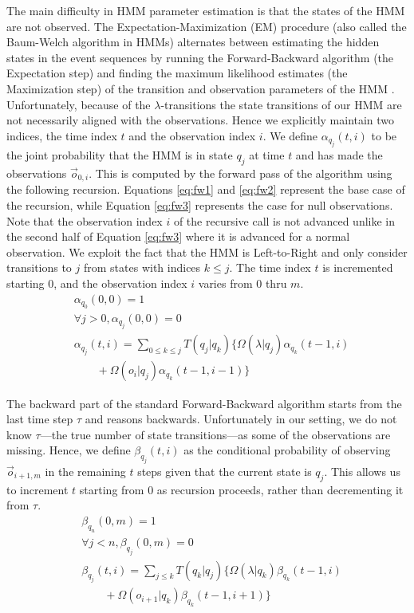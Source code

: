 \documentclass[letterpaper]{article}
\begin{document}
The main difficulty in HMM parameter estimation is that the
states of the HMM are not observed. The Expectation-Maximization  (EM)
procedure (also called the Baum-Welch algorithm in HMMs) alternates between estimating the hidden states in the event sequences by running the Forward-Backward algorithm (the Expectation step) and finding the maximum likelihood estimates (the Maximization step) of the transition and observation parameters of the HMM \cite{baum1970maximization}. %
Unfortunately, because of the $\lambda$-transitions the state transitions of our HMM are not necessarily aligned with the observations. Hence we
explicitly maintain two indices, the time index $t$ and the observation index $i$.  We define $\alpha_{q_j}(t,i)$ to be the joint probability that the HMM is in state $q_j$ at time $t$ and has made the observations $\vec{o}_{0,i}$. This is computed by the forward pass of the algorithm using the following recursion. Equations \ref{eq:fw1} and \ref{eq:fw2} represent the base case of the recursion, while Equation \ref{eq:fw3} represents the case for null observations. Note that the observation index $i$ of the recursive call is not advanced unlike in the second half of Equation \ref{eq:fw3} where it is advanced for a normal observation.  We exploit the fact that the HMM is Left-to-Right and only consider transitions to $j$ from states with indices $k \leq j$. The time index $t$ is incremented starting $0$, and the observation index $i$ varies from $0$ thru $m$. %
{\footnotesize
\begin{align}
&\alpha_{q_0}(0,0) = 1 \label{eq:fw1}\\
&\forall j > 0, \alpha_{q_j}(0,0) = 0 \label{eq:fw2}\\
&\alpha_{q_j}(t,i) = \sum_{0 \leq k \leq j} T(q_j|q_k) \{\Omega(\lambda|q_j) \alpha_{q_k}(t-1,i) \label{eq:fw3}\\
&\qquad + \Omega(o_{i}|q_j) \alpha_{q_k}(t-1,i-1) \} \nonumber
\end{align}
}%

The backward part of the standard Forward-Backward algorithm starts from the last time step $\tau$ and reasons backwards. Unfortunately in our setting, we do not know $\tau$---the true number of state transitions---as some of the observations are missing.  Hence, we define $\beta_{q_j}(t,i)$ as the conditional probability of observing $\vec{o}_{i+1,m}$ in the remaining $t$ steps given that the current state is $q_j$.  This allows us to increment $t$ starting from $0$ as recursion proceeds, rather than decrementing it from $\tau$.
{\footnotesize
\begin{align}
&\beta_{q_n}(0,m) = 1 \\
&\forall j < n, \beta_{q_j}(0,m) = 0 \\
&\beta_{q_j}(t,i) = \sum_{j \leq k} T(q_k|q_j) \{ \Omega(\lambda|q_k) \beta_{q_k}(t-1,i) \\  %
&\qquad + \Omega(o_{i+1}|q_k) \beta_{q_k}(t-1,i+1) \} \nonumber %
\end{align}
}%
\end{document}
